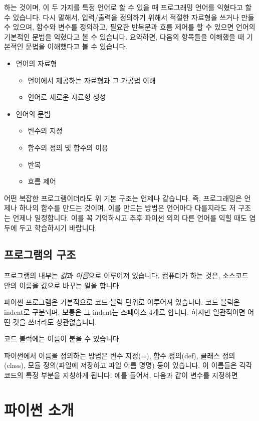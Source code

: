 \documentclass[twoside]{article}
\begin{document}
하는 것이며, 이 두 가지를 특정 언어로 할 수 있을 때 프로그래밍 언어를 익혔다고 할 수 있습니다. 다시 말해서, 입력/출력을 정의하기 위해서 적절한 자료형을 쓰거나 만들 수 있으며, 함수와 변수를 정의하고, 필요한 반복문과 흐름 제어를 할 수 있으면 언어의 기본적인 문법을 익혔다고 볼 수 있습니다. 요약하면, 다음의 항목들을 이해했을 때 기본적인 문법을 이해했다고 볼 수 있습니다. 


\begin{itemize} 
\item 언어의 자료형 
\begin{itemize}
\item 언어에서 제공하는 자료형과 그 가공법 이해 
\item 언어로 새로운 자료형 생성
\end{itemize} 
\item 언어의 문법 
\begin{itemize} 
\item 변수의 지정 
\item 함수의 정의 및 함수의 이용 
\item 반복 
\item 흐름 제어
\end{itemize}
\end{itemize}
 어떤 복잡한 프로그램이더라도 위 기본 구조는 언제나 같습니다. 즉, 프로그래밍은 언제나 하나의 함수를 만드는 것이며, 이를 만드는 방법은 언어마다 다를지라도 저 구조는 언제나 일정합니다. 이를 꼭 기억하시고 추후 파이썬 외의 다른 언어를 익힐 때도 염두에 두고 학습하시기 바랍니다. 

\subsection{프로그램의 구조} 

프로그램의 내부는 \textit{값}과 \textit{이름}으로 이루어져 있습니다. 컴퓨터가 하는 것은, 소스코드 안의 이름을 값으로 바꾸는 일을 합니다. 

파이썬 프로그램은 기본적으로 코드 블럭 단위로 이루어져 있습니다. 코드 블럭은 indent로 구분되며, 보통은 그 indent는 스페이스 4개로 합니다. 하지만 일관적이면 어떤 것을 쓰더라도 상관없습니다. 

코드 블럭에는 이름이 붙을 수 있습니다. 

파이썬에서 이름을 정의하는 방법은 변수 지정(=), 함수 정의(def), 클래스 정의(class), 모듈 정의(파일에 저장하고 파일 이름 명명) 등이 있습니다. 이 이름들은 각각 코드의 특정 부분을 지칭하게 됩니다. 예를 들어서, 다음과 같이 변수를 지정하면 

\section{파이썬 소개} 
\end{document}
